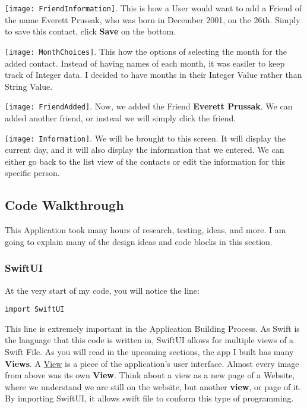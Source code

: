 \documentclass{article}
\theoremstyle{theorem}
\theoremstyle{definition}
\theoremstyle{remark}
\begin{document}
\texttt{[image: FriendInformation]}\noindent{}. This is how a User would want to add a Friend of the name Everett Prussak, who was born in December 2001, on the 26th. Simply to save this contact, click \textbf{Save} on the bottom. \newline\newline

\texttt{[image: MonthChoices]}\noindent{}. This how the options of selecting the month for the added contact. Instead of having names of each month, it was easiler to keep track of Integer data. I decided to have months in their Integer Value rather than String Value. \newline\newline

\texttt{[image: FriendAdded]}\noindent{}. Now, we added the Friend \textbf{Everett Prussak}. We can added another friend, or instead we will simply click the friend.\newline\newline

\texttt{[image: Information]}\noindent{}. We will be brought to this screen. It will display the current day, and it will also display the information that we entered. We can either go back to the list view of the contacts or edit the information for this specific person.


\subsection{Code Walkthrough}
\noindent This Application took many hours of research, testing, ideas, and more. I am going to explain many of the design ideas and code blocks in this section.

\subsubsection{SwiftUI}
At the very start of my code, you will notice the line:
\begin{verbatim}
import SwiftUI
\end{verbatim}

This line is extremely important in the Application Building Process. As Swift is the language that this code is written in, SwiftUI allows for multiple views of a Swift File. As you will read in the upcoming sections, the app I built has many \textbf{Views}. A \href{https://cocoacasts.com/swiftui-fundamentals-what-is-a-view}{View} is a piece of the application's user interface. Almost every image from above was its own \textbf{View}. Think about a view as a new page of a Website, where we understand we are still on the website, but another \textbf{view}, or page of it. By importing SwiftUI, it allows swift file to conform this type of programming.
\end{document}
